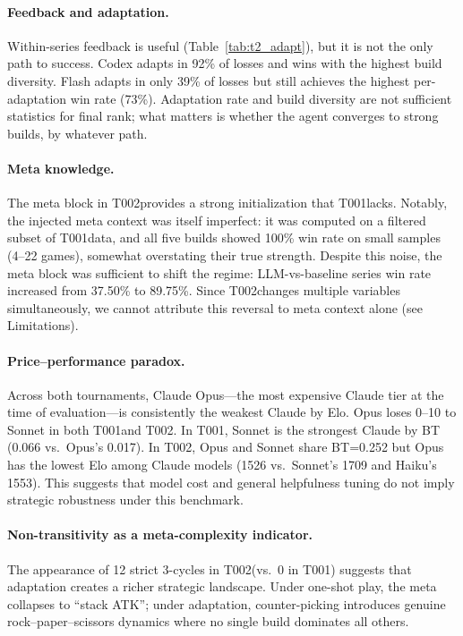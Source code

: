 \documentclass[11pt]{article}
\newcommand{\tOne}{T001}
\newcommand{\tTwo}{T002}
\begin{document}
\paragraph{Feedback and adaptation.}
Within-series feedback is useful (Table~\ref{tab:t2_adapt}), but it is not the only path to success.
Codex adapts in 92\% of losses and wins with the highest build diversity.
Flash adapts in only 39\% of losses but still achieves the highest per-adaptation win rate (73\%).
Adaptation rate and build diversity are not sufficient statistics for final rank; what matters is whether the agent converges to strong builds, by whatever path.

\paragraph{Meta knowledge.}
The meta block in \tTwo provides a strong initialization that \tOne lacks.
Notably, the injected meta context was itself imperfect: it was computed on a filtered subset of \tOne data, and all five builds showed 100\% win rate on small samples (4--22 games), somewhat overstating their true strength.
Despite this noise, the meta block was sufficient to shift the regime: LLM-vs-baseline series win rate increased from 37.50\% to 89.75\%.
Since \tTwo changes multiple variables simultaneously, we cannot attribute this reversal to meta context alone (see Limitations).

\paragraph{Price--performance paradox.}
Across both tournaments, Claude Opus---the most expensive Claude tier at the time of evaluation---is consistently the weakest Claude by Elo.
Opus loses 0--10 to Sonnet in both \tOne and \tTwo.
In \tOne, Sonnet is the strongest Claude by BT (0.066 vs.\ Opus's 0.017).
In \tTwo, Opus and Sonnet share BT=0.252 but Opus has the lowest Elo among Claude models (1526 vs.\ Sonnet's 1709 and Haiku's 1553).
This suggests that model cost and general helpfulness tuning do not imply strategic robustness under this benchmark.

\paragraph{Non-transitivity as a meta-complexity indicator.}
The appearance of 12 strict 3-cycles in \tTwo (vs.\ 0 in \tOne) suggests that adaptation creates a richer strategic landscape.
Under one-shot play, the meta collapses to ``stack ATK''; under adaptation, counter-picking introduces genuine rock--paper--scissors dynamics where no single build dominates all others.
\end{document}
